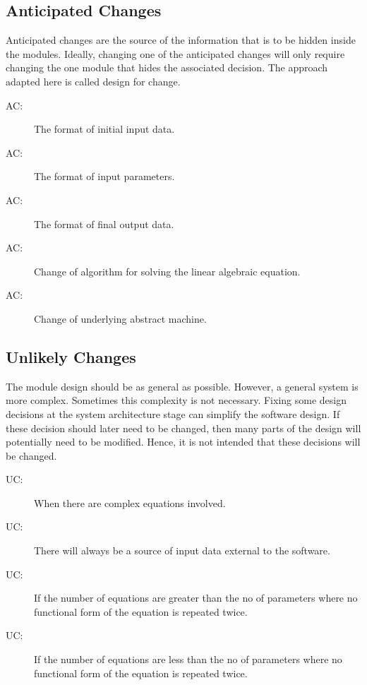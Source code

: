 \documentclass[12pt, titlepage]{article}
\newcounter{acnum}
\newcommand{\actheacnum}{AC\theacnum}
\newcounter{ucnum}
\newcommand{\uctheucnum}{UC\theucnum}
\begin{document}
\subsection{Anticipated Changes} \label{SecAchange}

Anticipated changes are the source of the information that is to be hidden
inside the modules. Ideally, changing one of the anticipated changes will only
require changing the one module that hides the associated decision. The approach
adapted here is called design for
change.

\begin{description}

\item[ \actheacnum \label{acInput}:] The format of initial input data.
\item[ \actheacnum \label{acInputp}:] The format of input parameters.
\item[ \actheacnum \label{acOutput}:] The format of final output data.
\item[ \actheacnum \label{acAlgorithm}:] Change of algorithm for solving the linear algebraic equation.
\item[ \actheacnum \label{acMachine}:]Change of underlying abstract machine.

\end{description}

\subsection{Unlikely Changes} \label{SecUchange}

The module design should be as general as possible. However, a general system is
more complex. Sometimes this complexity is not necessary. Fixing some design
decisions at the system architecture stage can simplify the software design. If
these decision should later need to be changed, then many parts of the design
will potentially need to be modified. Hence, it is not intended that these
decisions will be changed.

\begin{description}
\item[ \uctheucnum \label{ucComplex}:] When there are complex equations involved.
\item[ \uctheucnum \label{ucInput}:] There will always be
  a source of input data external to the software.
\item[ \uctheucnum \label{ucNOsolution}:] If the number of equations are greater than the no of parameters where no functional form of the equation is repeated twice.
\item[ \uctheucnum \label{ucInfinetsolution}:]If the number of equations are less than the no of parameters where no functional form of the equation is repeated twice.  
\end{description}
\end{document}
